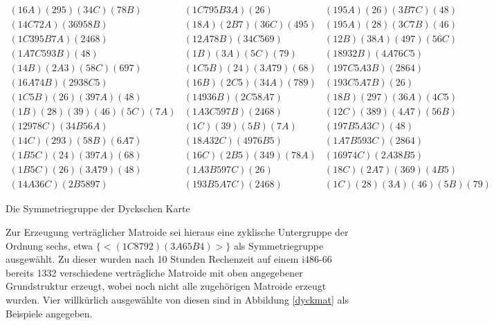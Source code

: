 \begin{table}[p]
{$$\begin{array}{lll}
(16A)(295)(34C)(78B) & (1C795B3A)(26) & (195A)(26)(3B7C)(48)\\
(14C72A)(36958B) & (18A)(2B7)(36C)(495) & (195A)(28)(3C7B)(46)\\
(1C395B7A)(2468) & (12A78B)(34C569) & (12B)(38A)(497)(56C)\\
(1A7C593B)(48) & (1B)(3A)(5C)(79) & (18932B)(4A76C5)\\
(14B)(2A3)(58C)(697) & (1C5B)(24)(3A79)(68) & (197C5A3B)(2864)\\
(16A74B)(2938C5) & (16B)(2C5)(34A)(789) & (193C5A7B)(26)\\
(1C5B)(26)(397A)(48) & (14936B)(2C58A7) & (18B)(297)(36A)(4C5)\\
(1B)(28)(39)(46)(5C)(7A) & (1A3C597B)(2468) & (12C)(389)(4A7)(56B)\\
(12978C)(34B56A) & (1C)(39)(5B)(7A) & (197B5A3C)(48)\\
(14C)(293)(58B)(6A7) & (18A32C)(4976B5) & (1A7B593C)(2864)\\
(1B5C)(24)(397A)(68) & (16C)(2B5)(349)(78A) & (16974C)(2A38B5)\\
(1B5C)(26)(3A79)(48) & (1A3B597C)(26) & (18C)(2A7)(369)(4B5)\\
(14A36C)(2B5897) & (193B5A7C)(2468) & (1C)(28)(3A)(46)(5B)(79)
\end{array}$$}
\caption{Die Symmetriegruppe der Dyckschen Karte}
\label{dyckaut}
\end{table}

Zur Erzeugung verträglicher Matroide sei hieraus eine zyklische
Untergruppe der Ordnung sechs, etwa $\{<(1C8792)(3A65B4)>\}$
als Symmetriegruppe ausgewählt. Zu dieser wurden nach 10 Stunden Rechenzeit
auf einem i486-66 bereits 1332 verschiedene verträgliche Matroide mit oben
angegebener Grundstruktur erzeugt, wobei noch nicht alle zugehörigen
Matroide erzeugt wurden. Vier willkürlich ausgewählte von diesen sind in
Abbildung \ref{dyckmat} als Beispiele angegeben.


